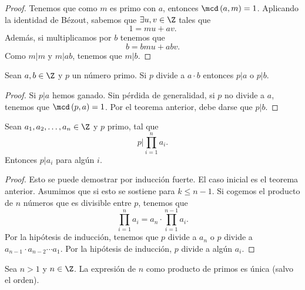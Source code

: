 \begin{proof}
Tenemos que como $\displaystyle m $ es primo con $\displaystyle a $, entonces $\displaystyle \mcd\left(a,m\right) = 1 $. Aplicando la identidad de Bézout, sabemos que $\displaystyle \exists u, v \in \Z $ tales que 
\[1 = mu + av .\]
Además, si multiplicamos por $\displaystyle b $ tenemos que
\[b = bmu + abv .\]
Como $\displaystyle m|m $ y $\displaystyle m|ab $, tenemos que $\displaystyle m|b $. 
\end{proof}

\begin{ftheorem}[]
\normalfont Sean $\displaystyle a,b \in \Z $ y $\displaystyle p $ un número primo. Si $\displaystyle p $ divide a $\displaystyle a \cdot b $ entonces $\displaystyle p |a $ o $\displaystyle p |b $. 
\end{ftheorem}

\begin{proof}
Si $\displaystyle p|a $ hemos ganado. Sin pérdida de generalidad, si $\displaystyle p $ no divide a $\displaystyle a $, tenemos que $\displaystyle \mcd\left(p,a\right) = 1 $. Por el teorema anterior, debe darse que $\displaystyle p|b $.
\end{proof}

\begin{fcolorary}[]
\normalfont Sean $\displaystyle a_{1}, a_{2}, \ldots, a_{n} \in \Z $ y $\displaystyle p $ primo, tal que 
\[p | \prod^{n}_{i = 1} a_{i} .\]
Entonces $\displaystyle p | a_{i} $ para algún $\displaystyle i $.
\end{fcolorary}

\begin{proof}
Esto se puede demostrar por inducción fuerte. El caso inicial es el teorema anterior. Asumimos que si esto se sostiene para $\displaystyle k\leq n-1 $. Si cogemos el producto de $\displaystyle n $ números que es divisible entre $\displaystyle p $, tenemos que 
\[ \prod^{n}_{i=1}a_{i} = a_{n} \cdot \prod^{n-1}_{i=1}a_{i} .\]
Por la hipótesis de inducción, tenemos que $\displaystyle p $ divide a $\displaystyle a_{n} $ o $\displaystyle p $ divide a $\displaystyle a_{n-1} \cdot a_{n-2} \cdots a_{1} $. Por la hipótesis de inducción, $\displaystyle p $ divide a algún $\displaystyle a_{i} $.
\end{proof}

\begin{ftheorem}[]
\normalfont Sea $\displaystyle n > 1 $ y $\displaystyle n \in \Z $. La expresión de $\displaystyle n $ como producto de primos es única (salvo el orden).
\end{ftheorem}

